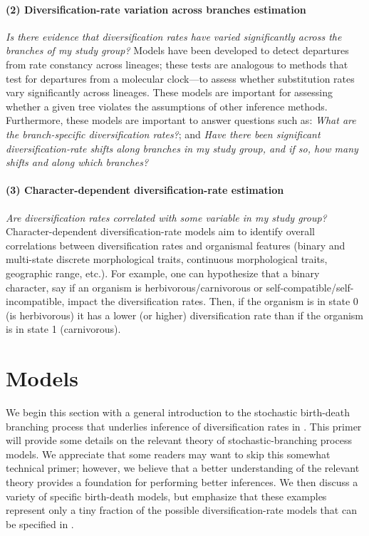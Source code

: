 \paragraph{(2) Diversification-rate variation across branches estimation}\textit{Is there evidence that diversification rates have varied significantly across the branches of my study group?}
Models have been developed to detect departures from rate constancy across lineages; these tests are analogous to methods that test for departures from a molecular clock---\IE to assess whether substitution rates vary significantly across lineages.
These models are important for assessing whether a given tree violates the assumptions of other inference methods.
Furthermore, these models are important to answer questions such as:
\textit{What are the branch-specific diversification rates?}; and
\textit{Have there been significant diversification-rate shifts along branches in my study group, and if so, how many shifts and along which branches?}


\paragraph{(3) Character-dependent diversification-rate estimation}\textit{Are diversification rates correlated with some variable in my study group?}
Character-dependent diversification-rate models aim to identify overall correlations between diversification rates and organismal features (binary and multi-state discrete morphological traits, continuous morphological traits, geographic range, etc.).
For example, one can hypothesize that a binary character, say if an organism is herbivorous/carnivorous or self-compatible/self-incompatible, impact the diversification rates.
Then, if the organism is in state 0 (\EG is herbivorous) it has a lower (or higher) diversification rate than if the organism is in state 1 (\EG carnivorous).


\section{Models}\label{sec:Models}

We begin this section with a general introduction to the stochastic birth-death branching process that underlies inference of diversification rates in \RevBayes.
This primer will provide some details on the relevant theory of stochastic-branching process models.
We appreciate that some readers may want to skip this somewhat technical primer; however, we believe that a better understanding of the relevant theory provides a foundation for performing better inferences.
We then discuss a variety of specific birth-death models, but emphasize that these examples represent only a tiny fraction of the possible diversification-rate models that can be specified in \RevBayes.


